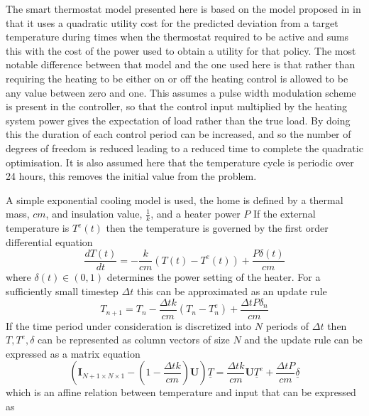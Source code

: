 \documentclass[a4paper, 10 pt, conference]{ieeeconf}  %
\begin{document}
The smart thermostat model presented here is based on the model proposed in \cite{rogers2011adaptive} in that it uses a quadratic utility cost for the predicted deviation from a target temperature during times when the thermostat required to be active and sums this with the cost of the power used to obtain a utility for that policy. The most notable difference between that model and the one used here is that rather than requiring the heating to be either on or off the heating control is allowed to be any value between zero and one. This assumes a pulse width modulation scheme is present in the controller, so that the control input multiplied by the heating system power gives the expectation of load rather than the true load. By doing this the duration of each control period can be increased, and so the number of degrees of freedom is reduced leading to a reduced time to complete the quadratic optimisation. It is also assumed here that the temperature cycle is periodic over 24 hours, this removes the initial value from the problem.

A simple exponential cooling model is used, the home is defined by a thermal mass, $cm$, and insulation value, $\frac{1}{k}$, and a heater power $P$ If the external temperature is $T^{e}(t)$ then the temperature is governed by the first order differential equation
\begin{equation}
\frac{dT(t)}{dt} = -\frac{k}{cm}(T(t)-T^{e}(t)) +\frac{P\delta(t)}{cm}
\end{equation}
where $\delta(t) \in (0,1)$ determines the power setting of the heater. For a sufficiently small timestep $\Delta t$  this can be approximated as an update rule
\begin{equation}
T_{n+1} =  T_{n}-\frac{\Delta t k}{cm}(T_{n}-T_{n}^{e}) + \frac{\Delta t P \delta_{n}}{cm} 
\end{equation}
If the time period under consideration is discretized into $N$ periods of $\Delta t$ then $T, T^{e},\delta$ can be represented as column vectors of size $N$ and the update rule can be expressed as a matrix equation
\begin{equation}
\left( \mathbf{I}_{N+1 \times N \times 1}-(1-\frac{\Delta t k}{cm})\mathbf{U}\right) \underline{T} = \frac{\Delta t k}{cm}\mathbf{U}\underline{T}^{e}+\frac{\Delta t P}{cm}\underline{\delta}
\end{equation}
which is an affine relation between temperature and input that can be expressed as
\end{document}
